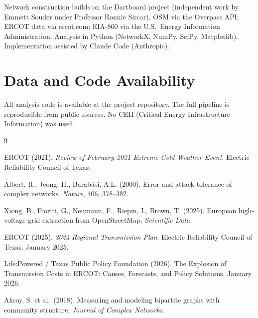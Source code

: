 \documentclass[12pt,letterpaper]{article}
\begin{document}
Network construction builds on the Dartboard project (independent work by Emmett Souder under Professor Ronnie Sircar). OSM via the Overpass API; ERCOT data via ercot.com; EIA-860 via the U.S.\ Energy Information Administration. Analysis in Python (NetworkX, NumPy, SciPy, Matplotlib). Implementation assisted by Claude Code (Anthropic).

\section*{Data and Code Availability}

All analysis code is available at the project repository. The full pipeline is reproducible from public sources. No CEII (Critical Energy Infrastructure Information) was used.

\begin{thebibliography}{9}

ERCOT (2021). \textit{Review of February 2021 Extreme Cold Weather Event}. Electric Reliability Council of Texas.

Albert, R., Jeong, H., Barab\'{a}si, A.L. (2000). Error and attack tolerance of complex networks. \textit{Nature}, 406, 378--382.

Xiong, B., Fioriti, G., Neumann, F., Riepin, I., Brown, T. (2025). European high-voltage grid extraction from OpenStreetMap. \textit{Scientific Data}.

ERCOT (2025). \textit{2024 Regional Transmission Plan}. Electric Reliability Council of Texas. January 2025.

Life:Powered / Texas Public Policy Foundation (2026). The Explosion of Transmission Costs in ERCOT: Causes, Forecasts, and Policy Solutions. January 2026.

Aksoy, S. et al.\ (2018). Measuring and modeling bipartite graphs with community structure. \textit{Journal of Complex Networks}.

\end{thebibliography}
\end{document}
